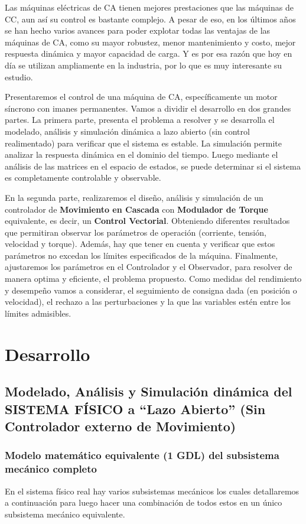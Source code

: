 \documentclass[10pt]{article}
\begin{document}
Las máquinas eléctricas de CA tienen mejores prestaciones que las máquinas de CC, aun así su control es bastante complejo.
A pesar de eso, en los últimos años se han hecho varios avances para poder explotar todas las ventajas de las máquinas de CA, como su mayor robustez, menor mantenimiento y costo, mejor respuesta dinámica y mayor capacidad de carga.
Y es por esa razón que hoy en día se utilizan ampliamente en la industria, por lo que es muy interesante su estudio.
\\
\par
Presentaremos el control de una máquina de CA, específicamente un motor síncrono con imanes permanentes.
Vamos a dividir el desarrollo en dos grandes partes.
La primera parte, presenta el problema a resolver y se desarrolla el modelado, análisis y simulación dinámica a lazo abierto (sin control realimentado) para verificar que el sistema es estable.
La simulación permite analizar la respuesta dinámica en el dominio del tiempo.
Luego mediante el análisis de las matrices en el espacio de estados, se puede determinar si el sistema es completamente controlable y observable.
\\
\par
En la segunda parte, realizaremos el diseño, análisis y simulación de un controlador de \textbf{Movimiento en Cascada} con \textbf{Modulador de Torque} equivalente, es decir, un \textbf{Control Vectorial}.
Obteniendo diferentes resultados que permitiran observar los parámetros de operación (corriente, tensión, velocidad y torque).
Además, hay que tener en cuenta y verificar que estos parámetros no excedan los límites especificados de la máquina.
Finalmente, ajustaremos los parámetros en el Controlador y el Observador, para resolver de manera optima y eficiente, el problema propuesto.
Como medidas del rendimiento y desempeño vamos a considerar, el seguimiento de consigna dada (en posición o velocidad), el rechazo a las perturbaciones y la que las variables estén entre los límites admisibles.

\section{Desarrollo}
\subsection{Modelado, Análisis y Simulación dinámica del SISTEMA FÍSICO a “Lazo Abierto” (Sin Controlador externo de Movimiento)}
\subsubsection{Modelo matemático equivalente (1 GDL) del subsistema mecánico completo}
En el sistema físico real hay varios subsistemas mecánicos los cuales detallaremos a continuación para luego hacer una combinación de todos estos en un único subsistema mecánico equivalente.
\end{document}
